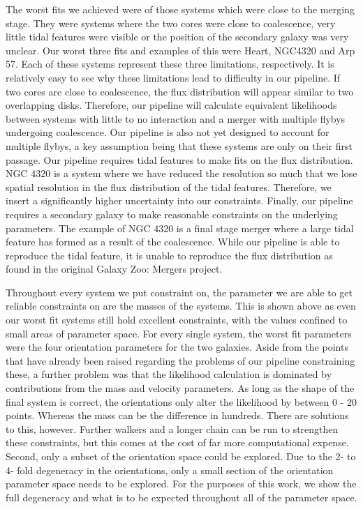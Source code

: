 The worst fits we achieved were of those systems which were close to the merging stage. They were systems where the two cores were close to coalescence, very little tidal features were visible or the position of the secondary galaxy was very unclear. Our worst three fits and examples of this were Heart, NGC4320 and Arp 57. Each of these systems represent these three limitations, respectively. It is relatively easy to see why these limitations lead to difficulty in our pipeline. If two cores are close to coalescence, the flux distribution will appear similar to two overlapping disks. Therefore, our pipeline will calculate equivalent likelihoods between systems with little to no interaction and a merger with multiple flybys undergoing coalescence. Our pipeline is also not yet designed to account for multiple flybys, a key assumption being that these systems are only on their first passage. Our pipeline requires tidal features to make fits on the flux distribution. NGC 4320 is a system where we have reduced the resolution so much that we lose spatial resolution in the flux distribution of the tidal features. Therefore, we insert a significantly higher uncertainty into our constraints. Finally, our pipeline requires a secondary galaxy to make reasonable constraints on the underlying parameters. The example of NGC 4320 is a final stage merger where a large tidal feature has formed as a result of the coalescence. While our pipeline is able to reproduce the tidal feature, it is unable to reproduce the flux distribution as found in the original Galaxy Zoo: Mergers project.

Throughout every system we put constraint on, the parameter we are able to get reliable constraints on are the masses of the systems. This is shown above as even our worst fit systems still hold excellent constraints, with the values confined to small areas of parameter space. For every single system, the worst fit parameters were the four orientation parameters for the two galaxies. Aside from the points that have already been raised regarding the problems of our pipeline constraining these, a further problem was that the likelihood calculation is dominated by contributions from the mass and velocity parameters. As long as the shape of the final system is correct, the orientations only alter the likelihood by between 0 - 20 points. Whereas the mass can be the difference in hundreds. There are solutions to this, however. Further walkers and a longer chain can be run to strengthen these constraints, but this comes at the cost of far more computational expense. Second, only a subset of the orientation space could be explored. Due to the 2- to 4- fold degeneracy in the orientations, only a small section of the orientation parameter space needs to be explored. For the purposes of this work, we show the full degeneracy and what is to be expected throughout all of the parameter space.

